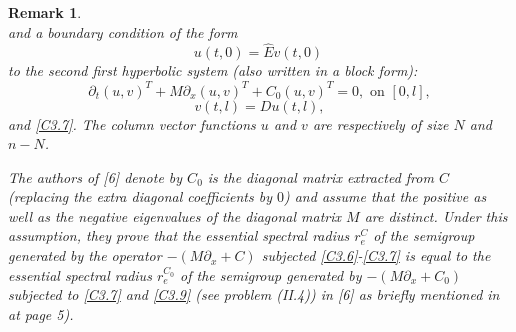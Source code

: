 \documentclass[10pt, english]{article}
\newtheorem{oss}[thm]{Remark}
\begin{document}
{\begin{oss}
\begin{equation}
 \end{equation}
and a boundary condition of the form
\begin{equation}\label{C3.7}%
 u(t,0)=\widehat{E}v(t,0)\
 \end{equation}
\noindent to the second first hyperbolic system (also written in a block form):
\begin{equation}\label{C3.8}%
 \partial_t(u,v)^T + M\partial_x(u,v)^T + C_0(u,v)^T=0, \mbox{ on } [0,l],
 \end{equation}
\begin{equation}\label{C3.9}%
 v(t,l)=Du(t,l), 
 \end{equation}
and \eqref{C3.7}. The column vector functions $u$ and $v$ are respectively of size $N$ and $n-N$.

The authors of [6] denote by $C_{0}$ is the diagonal matrix extracted from $C$ (replacing the extra diagonal coefficients by $0$) and assume that the positive as well as the negative eigenvalues of the diagonal matrix $M$ are distinct. Under this assumption,
they prove that the essential spectral radius $r_e^C$ of the semigroup generated by the operator $-(M\partial_x +C)$ subjected \eqref{C3.6}-\eqref{C3.7} is equal to the essential spectral radius $r_e^{C_{0}}$ of the semigroup generated by $-(M\partial_x +C_0)$ subjected to \eqref{C3.7} and  \eqref{C3.9} (see problem (II.4)) in [6] as briefly mentioned in \cite{SW2003} at page 5).
\end{oss}

}
\end{document}
